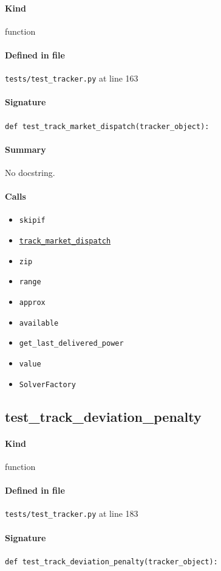 \documentclass[11pt]{report}
\begin{document}
\paragraph{Kind} function
\paragraph{Defined in file} \texttt{tests/test\_tracker.py} at line 163
\paragraph{Signature} \texttt{def test\_track\_market\_dispatch(tracker\_object):}
\paragraph{Summary} No docstring.
\paragraph{Calls}
\begin{itemize}[leftmargin=*]
  \item \texttt{skipif}
  \item \hyperref[def:tracker.py:Tracker.track_market_dispatch:L283]{\texttt{track\_market\_dispatch}}
  \item \texttt{zip}
  \item \texttt{range}
  \item \texttt{approx}
  \item \texttt{available}
  \item \texttt{get\_last\_delivered\_power}
  \item \texttt{value}
  \item \texttt{SolverFactory}
\end{itemize}
\subsection{test\_track\_deviation\_penalty}
\label{def:tests-test_tracker.py:test_track_deviation_penalty:L183}
\paragraph{Kind} function
\paragraph{Defined in file} \texttt{tests/test\_tracker.py} at line 183
\paragraph{Signature} \texttt{def test\_track\_deviation\_penalty(tracker\_object):}
\end{document}
